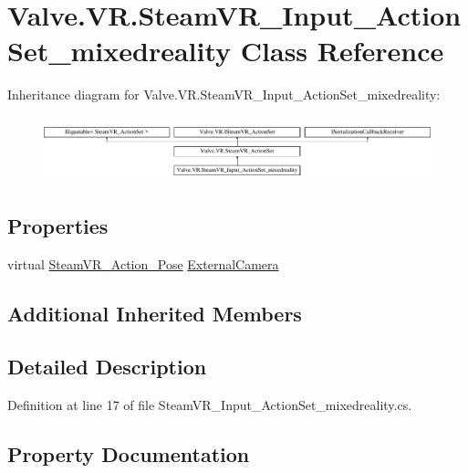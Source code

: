 \hypertarget{class_valve_1_1_v_r_1_1_steam_v_r___input___action_set__mixedreality}{}\section{Valve.\+V\+R.\+Steam\+V\+R\+\_\+\+Input\+\_\+\+Action\+Set\+\_\+mixedreality Class Reference}
\label{class_valve_1_1_v_r_1_1_steam_v_r___input___action_set__mixedreality}
Inheritance diagram for Valve.\+V\+R.\+Steam\+V\+R\+\_\+\+Input\+\_\+\+Action\+Set\+\_\+mixedreality\+:\begin{figure}[H]
\begin{center}
\leavevmode
\includegraphics[height=1.879195cm]{class_valve_1_1_v_r_1_1_steam_v_r___input___action_set__mixedreality}
\end{center}
\end{figure}
\subsection*{Properties}
\begin{DoxyCompactItemize}
\item 
virtual \mbox{\hyperlink{class_valve_1_1_v_r_1_1_steam_v_r___action___pose}{Steam\+V\+R\+\_\+\+Action\+\_\+\+Pose}} \mbox{\hyperlink{class_valve_1_1_v_r_1_1_steam_v_r___input___action_set__mixedreality_a855c8c3452b4947b3eb5e528c83c56f1}{External\+Camera}}
\end{DoxyCompactItemize}
\subsection*{Additional Inherited Members}


\subsection{Detailed Description}


Definition at line 17 of file Steam\+V\+R\+\_\+\+Input\+\_\+\+Action\+Set\+\_\+mixedreality.\+cs.



\subsection{Property Documentation}
\mbox{\label{class_valve_1_1_v_r_1_1_steam_v_r___input___action_set__mixedreality_a855c8c3452b4947b3eb5e528c83c56f1}} 

